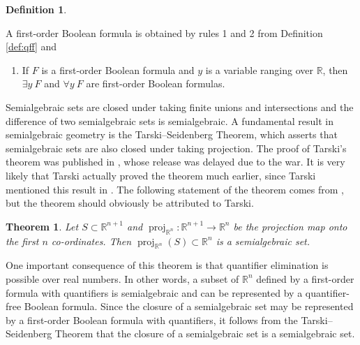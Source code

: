 \documentclass[
]{book}
\providecommand{\tightlist}{%
  \setlength{\itemsep}{0pt}\setlength{\parskip}{0pt}}
\newtheorem{theorem}{Theorem}[chapter]
\theoremstyle{definition}
\newtheorem{definition}{Definition}[chapter]
\theoremstyle{definition}
\theoremstyle{definition}
\theoremstyle{definition}
\theoremstyle{remark}
\begin{document}
\begin{definition}
\protect\hypertarget{def:first-order-formula}{}\label{def:first-order-formula}

A first-order Boolean formula is obtained by rules 1 and 2 from Definition \ref{def:qff} and

\begin{enumerate}
\def\labelenumi{\arabic{enumi}.}
\setcounter{enumi}{2}
\tightlist
\item
  If \(F\) is a first-order Boolean formula and \(y\) is a variable ranging over \(\mathbb{R}\), then \(\exists y\ F\) and \(\forall y\ F\) are first-order Boolean formulas.
\end{enumerate}

\end{definition}

Semialgebraic sets are closed under taking finite unions and intersections and the difference of two semialgebraic sets is semialgebraic.
A fundamental result in semialgebraic geometry is the Tarski--Seidenberg Theorem, which asserts that semialgebraic sets are also closed under taking projection.
The proof of Tarski's theorem was published in \citep{tarski1998}, whose release was delayed due to the war. It is very likely that Tarski actually proved the theorem much earlier, since Tarski mentioned this result in \citet{sierpinski1930}. The following statement of the theorem comes from \citep{vdd1988tarski}, but the theorem should obviously be attributed to Tarski.

\begin{theorem}
\protect\hypertarget{thm:tarski-seinedberg}{}\label{thm:tarski-seinedberg}\citep{vdd1988tarski}
Let \(S \subset \mathbb{R}^{n+1}\) and \({\operatorname{proj}_{\mathbb{R}^{n}}} : \mathbb{R}^{n+1} \to \mathbb{R}^n\) be the projection map onto the first \(n\) co-ordinates. Then \({\operatorname{proj}_{\mathbb{R}^{n}}}(S) \subset \mathbb{R}^n\) is a semialgebraic set.
\end{theorem}

One important consequence of this theorem is that quantifier elimination is possible over real numbers. In other words, a subset of \(\mathbb{R}^n\) defined by a first-order formula with quantifiers is semialgebraic and can be represented by a quantifier-free Boolean formula.
Since the closure of a semialgebraic set may be represented by a first-order Boolean formula with quantifiers, it follows from the Tarski--Seidenberg Theorem that the closure of a semialgebraic set is a semialgebraic set.
\end{document}
